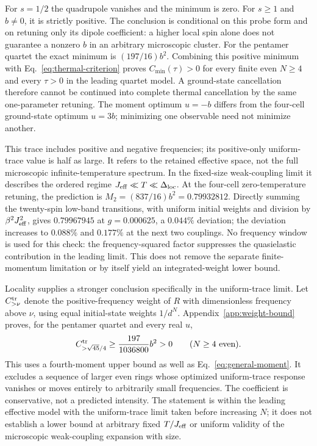 For $s=1/2$ the quadrupole vanishes and the minimum is zero. For
$s\ge1$ and $b\ne0$, it is strictly positive. The conclusion is
conditional on this probe form and on retuning only its dipole
coefficient: a higher local spin alone does not guarantee a nonzero $b$
in an arbitrary microscopic cluster. For the pentamer quartet the exact
minimum is $(197/16)b^2$. Combining this positive minimum with
Eq.~\eqref{eq:thermal-criterion} proves $C_{\min}(\tau)>0$ for every
finite even $N\ge4$ and every $\tau>0$ in the leading quartet model.
A ground-state cancellation therefore cannot be continued into complete
thermal cancellation by the same one-parameter retuning.
The moment optimum $u=-b$ differs from the four-cell ground-state optimum
$u=3b$; minimizing one observable need not minimize another.

This trace includes positive and negative frequencies; its positive-only
uniform-trace value is half as large. It refers to the retained effective
space, not the full microscopic infinite-temperature spectrum. In the
fixed-size weak-coupling limit it describes the ordered regime
$J_{\rm eff}\ll T\ll\Delta_{\mathrm{loc}}$. At the four-cell zero-temperature retuning,
the prediction is $M_2=(837/16)b^2=0.79932812$. Directly summing the
twenty-spin low-band transitions, with uniform initial weights and
division by $\beta^2J_{\rm eff}^2$, gives $0.79967945$ at
$g=0.000625$, a $0.044\%$ deviation; the deviation increases to
$0.088\%$ and $0.177\%$ at the next two couplings. No frequency window
is used for this check: the frequency-squared factor suppresses the
quasielastic contribution in the leading limit. This does not remove the
separate finite-momentum limitation or by itself yield an integrated-weight
lower bound.

Locality supplies a stronger conclusion specifically in the uniform-trace
limit. Let $C^{\rm tr}_{>\nu}$ denote the positive-frequency weight of
$R$ with dimensionless frequency above $\nu$, using equal initial-state
weights $1/d^N$. Appendix~\ref{app:weight-bound} proves, for the pentamer
quartet and every real $u$,
\begin{equation}
 C^{\rm tr}_{>\sqrt{45}/4}\ge\frac{197}{1036800}b^2>0
 \qquad(N\ge4\text{ even}).
 \label{eq:quartet-window-bound}
\end{equation}
This uses a fourth-moment upper bound as well as
Eq.~\eqref{eq:general-moment}. It excludes a sequence of larger even
rings whose optimized uniform-trace response vanishes or moves entirely
to arbitrarily small frequencies. The coefficient is conservative, not
a predicted intensity. The statement is within the leading effective
model with the uniform-trace limit taken before increasing $N$; it does
not establish a lower bound at arbitrary fixed $T/J_{\rm eff}$ or
uniform validity of the microscopic weak-coupling expansion with size.

